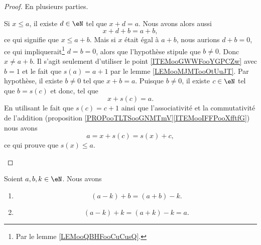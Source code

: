 \begin{proof}
	En plusieurs parties.
	\begin{subproof}
		Si \( x\leq a\), il existe \( d\in \eN\) tel que \( x+d=a\). Nous avons alors aussi
		\begin{equation}
			x+d+b=a+b,
		\end{equation}
		ce qui signifie que \( x\leq a+b\). Mais si \( x\) était égal à \( a+b\), nous aurions \( d+b=0\), ce qui impliquerait\footnote{Par le lemme \ref{LEMooQBHFooCuCusQ}.} \( d=b=0\), alors que l'hypothèse stipule que \( b\neq 0\). Donc \( x\neq a+b\).
		Il s'agit seulement d'utiliser le point \ref{ITEMooGWWFooYGPCZw} avec \( b=1\) et le fait que \( s(a)=a+1\) par le lemme \ref{LEMooMJMTooOtUuJT}.
		Par hypothèse, il existe \( b\neq 0\) tel que \( x+b=a\). Puisque \( b\neq 0\), il existe \( c\in \eN\) tel que \( b=s(c)\) et donc, tel que
		\begin{equation}
			x+s(c)=a.
		\end{equation}
		En utilisant le fait que \( s(c)=c+1\) ainsi que l'associativité et la commutativité de l'addition (proposition \ref{PROPooTLTSooGNMTmV}\ref{ITEMooIFFPooXfftfG}) nous avons
		\begin{equation}
			a=x+s(c)=s(x)+c,
		\end{equation}
		ce qui prouve que \( s(x)\leq a\).
	\end{subproof}
\end{proof}

\begin{proposition}	\label{PROPooAKLVooBkRIAT}
	Soient \( a,b,k\in \eN\). Nous avons
	\begin{enumerate}
		\item			\label{ITEMooFMQCooSjuCDV}
		      \begin{equation}
			      (a-k)+b=(a+b)-k.
		      \end{equation}
		\item		\label{ITEMooKHLDooEEXjmF}
		      \begin{equation}
			      (a-k)+k=(a+k)-k=a.
		      \end{equation}
	\end{enumerate}
\end{proposition}

